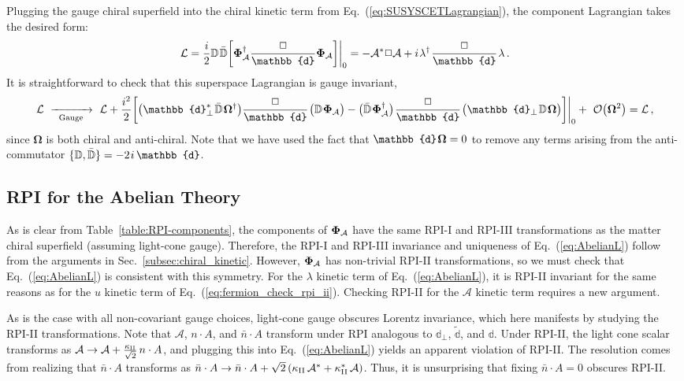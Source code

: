 \documentclass[12pt,document,nofootinbib,superscriptaddress,onecolumn,preprintnumbers,balancelastpage]{article}
\newcommand{\s}{\hspace{0.8pt}}
\newcommand{\PP}{\mathbb{d}}
\newcommand{\gauge}{\,\,\xrightarrow[\hspace{5pt}\text{Gauge}\hspace{5pt}]{}\,\,}
\DeclareRobustCommand{\Sec}[1]{Sec.~\ref{#1}}
\DeclareRobustCommand{\Tab}[1]{Table~\ref{#1}}
\DeclareRobustCommand{\Eq}[1]{Eq.~(\ref{#1})}
\newcommand{\D}{\mathbb{D}}
\newcommand{\RCA}{\boldsymbol{\Omega}}
\newcommand{\alc}{\mathcal{A}}
\newcommand{\bPhiA}{\bold \Phi_{\alc}}
\begin{document}
\begin{spacing}{1.2}
Plugging the gauge chiral superfield into the chiral kinetic term from \Eq{eq:SUSYSCETLagrangian}, the component Lagrangian takes the desired form:
\begin{align}
\mathcal{L}= \frac{i}{2} \D\s \bar{\D} \bigg[ \bPhiA^\dagger \frac{\Box}{\PP}  \bPhiA \bigg] \bigg|_0= -\alc^* \Box \alc +  i\s  \lambda^\dagger\s \frac{\Box}{\PP}\s  \lambda \,.
\label{eq:AbelianL}
\end{align}
%
It is straightforward to check that this superspace Lagrangian is gauge invariant,
\begin{align}
\label{eq:abelian_gauge_inv}
\mathcal{L} \gauge  \mathcal{L} +  \frac{i^2}{2} \bigg[ \big(\PP_\perp^*\s \bar{\D}\s  \RCA^\dagger\big)\frac{ \Box}{\PP}\s \big(\D\s \bPhiA\big) - \big(\bar{\D}\s \bPhiA^\dagger \big)\s \frac{ \Box}{\PP}\s \big(\PP_\perp\s \D \s\RCA\big) \bigg] \bigg|_0 + \,\, \mathcal{O}\big(\RCA^2\big) = \mathcal{L}\,,
\end{align}
since $\RCA$ is both chiral and anti-chiral.
%
Note that we have used the fact that $\PP \s \RCA = 0$ to remove any terms arising from the anti-commutator $\{\D, \bar{\D}\} = -2 \s i  \, \PP$.


\subsection{RPI for the Abelian Theory}

As is clear from \Tab{table:RPI-components}, the components of $\bPhiA$ have the same RPI-I and RPI-III transformations as the matter chiral superfield (assuming light-cone gauge).
%
Therefore, the RPI-I and RPI-III invariance and uniqueness of \Eq{eq:AbelianL} follow from the arguments in \Sec{subsec:chiral_kinetic}.
%
However, $\bPhiA$ has non-trivial RPI-II transformations, so we must check that \Eq{eq:AbelianL} is consistent with this symmetry.
%
For the $\lambda$ kinetic term of \Eq{eq:AbelianL}, it is RPI-II invariant for the same reasons as for the $u$ kinetic term of \Eq{eq:fermion_check_rpi_ii}.
%
Checking RPI-II for the $\alc$ kinetic term requires a new argument.


As is the case with all non-covariant gauge choices, light-cone gauge obscures Lorentz invariance, which here manifests by studying the RPI-II transformations.
%
Note that $\alc$, $n\cdot A$, and $\bar{n} \cdot A$ transform under RPI analogous to $\PP_\perp$, $\tilde{\PP}$, and $\PP$. 
%
Under RPI-II, the light cone scalar transforms as $\alc \to \alc + \frac{\kappa_{\rm II}}{\sqrt{2}}\, n \cdot A$, and plugging this into \Eq{eq:AbelianL} yields an apparent violation of RPI-II.
%
The resolution comes from realizing that  $\bar{n} \cdot A$ transforms as $\bar{n} \cdot A \to \bar{n} \cdot A + \sqrt{2}\left(\kappa_{\rm II}\, \alc^* + \kappa_{\rm II}^*\, \alc \right)$.
%
Thus, it is unsurprising that fixing $\bar{n}\cdot A =0$ obscures RPI-II. 



\end{spacing}
\end{document}
